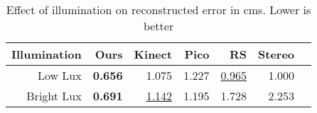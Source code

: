 \begin{table}
    \centering
\begin{tabular}{rrrrrrr}
\toprule
Illumination & Ours & Kinect &  Pico & RS &  Stereo \\
\midrule
    Low Lux& \textbf{0.656} &   1.075 & 1.227 &            \underline{0.965} &             1.000 \\
    Bright Lux & \textbf{0.691} &   \underline{1.142} & 1.195 &            1.728 &             2.253 \\
\bottomrule
\end{tabular}
\caption{Effect of illumination on reconstructed error in cms. Lower is better}
\label{tab:depth_illum}
\end{table}
